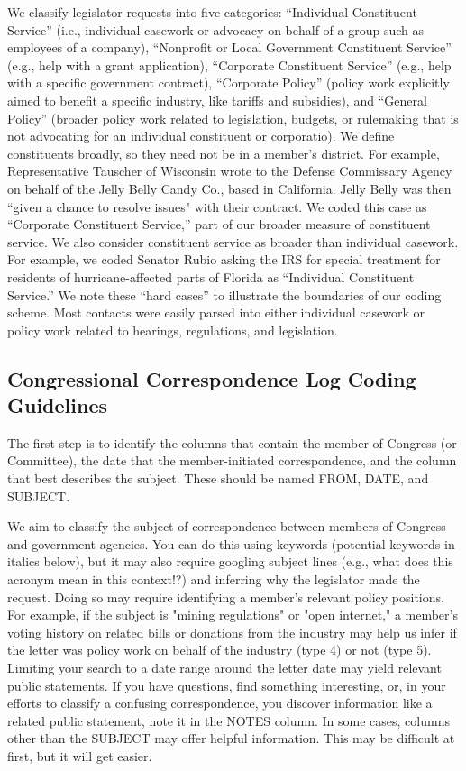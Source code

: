 We classify legislator requests into five categories: ``Individual Constituent Service'' (i.e., individual casework or advocacy on behalf of a group such as employees of a company), ``Nonprofit or Local Government Constituent Service'' (e.g., help with a grant application), ``Corporate Constituent Service'' (e.g., help with a specific government contract), ``Corporate Policy'' (policy work explicitly aimed to benefit a specific industry, like tariffs and subsidies), and ``General Policy'' (broader policy work related to legislation, budgets, or rulemaking that is not advocating for an individual constituent or corporatio). We define constituents broadly, so they need not be in a member's district. For example, Representative Tauscher of Wisconsin wrote to the Defense Commissary Agency on behalf of the Jelly Belly Candy Co., based in California. Jelly Belly was then ``given a chance to resolve issues" with their contract. We coded this case as ``Corporate Constituent Service,'' part of our broader measure of constituent service. We also consider constituent service as broader than individual casework. For example, we coded Senator Rubio asking the IRS for special treatment for residents of hurricane-affected parts of Florida as ``Individual Constituent Service.'' We note these ``hard cases'' to illustrate the boundaries of our coding scheme. Most contacts were easily parsed into either individual casework or policy work related to hearings, regulations, and legislation.

\subsection{Congressional Correspondence Log Coding Guidelines}

The first step is to identify the columns that contain the member of Congress (or Committee), the date that the member-initiated correspondence, and the column that best describes the subject. These should be named FROM, DATE, and SUBJECT. 

We aim to classify the subject of correspondence between members of Congress and government agencies. You can do this using keywords (potential keywords in italics below), but it may also require googling subject lines (e.g., what does this acronym mean in this context!?) and inferring why the legislator made the request. Doing so may require identifying a member's relevant policy positions. For example, if the subject is "mining regulations" or "open internet," a member's voting history on related bills or donations from the industry may help us infer if the letter was policy work on behalf of the industry (type 4) or not (type 5). Limiting your search to a date range around the letter date may yield relevant public statements. If you have questions, find something interesting, or, in your efforts to classify a confusing correspondence, you discover information like a related public statement, note it in the NOTES column. In some cases, columns other than the SUBJECT may offer helpful information. This may be difficult at first, but it will get easier. \\

